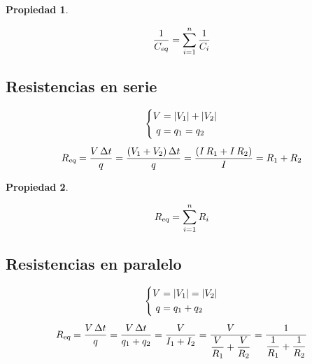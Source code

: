 \documentclass[a5paper,12pt,twoside]{book}
\newtheorem{prop}{{Propiedad}}[chapter]
\begin{document}
\begin{mdframed}[style=MyFrame1]
    \begin{prop}
    \end{prop}
    \begin{equation*}
        \frac{1}{{{C}_\textsl{{eq}}}} = \sum_{i=1}^n \frac{1}{C_i}
    \end{equation*}
\end{mdframed}


\subsection{Resistencias en serie}

\begin{gather*}
    \left\{
    \begin{aligned}
        V &= {\left| {V_1} \right|} + {\left| {V_2} \right|}
        \\
        q &= q_1 = q_2
    \end{aligned}
    \right.
    \\[1ex]
    {{R}_\textsl{{eq}}} = \frac{V \, \Delta t}{q} = \frac{\left(V_1 + V_2\right) \Delta t}{q} = \frac{\left(I \, R_1 + I \, R_2\right)}{I} = R_1 + R_2
\end{gather*}

\begin{mdframed}[style=MyFrame1]
    \begin{prop}
    \end{prop}
    \begin{equation*}
        {{R}_\textsl{{eq}}} = \sum_{i=1}^n R_i
    \end{equation*}
\end{mdframed}


\subsection{Resistencias en paralelo}

\begin{gather*}
    \left\{
    \begin{aligned}
        V &= {\left| {V_1} \right|} = {\left| {V_2} \right|}
        \\
        q &= q_1 + q_2
    \end{aligned}
    \right.
    \\[1ex]
    {{R}_\textsl{{eq}}} = \frac{V \, \Delta t}{q}
    = \frac{V \, \Delta t}{q_1 + q_2}
    = \frac{V}{I_1 + I_2} = \frac{V}{\dfrac{V}{R_1} + \dfrac{V}{R_2}}
    = \frac{1}{\dfrac{1}{R_1}+\dfrac{1}{R_2}}
\end{gather*}
\end{document}
